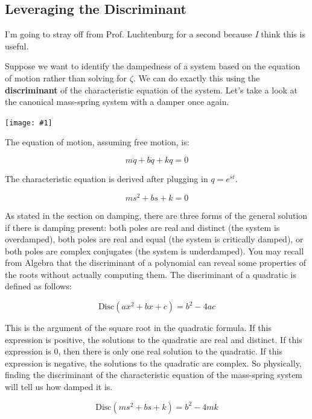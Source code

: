 \documentclass{report}
\newcommand{\bicture}[1]{
\begin{center}
    {\texttt{[image: \#1]}}
\end{center}}
\begin{document}
\begin{onehalfspacing}
\begin{flushleft}
\section{Leveraging the Discriminant}

I'm going to stray off from Prof. Luchtenburg for a second because \textit{I} think this is useful.

\medskip

Suppose we want to identify the dampedness of a system based on the equation of motion rather than solving for \(\zeta\). We can do exactly this using the \textbf{discriminant} of the characteristic equation of the system. Let's take a look at the canonical mass-spring system with a damper once again.

\bicture{2_unf}

The equation of motion, assuming free motion, is:

\vspace{-0.1in}
\[m\ddot{q} + b \dot{q} + k q = 0\]

The characteristic equation is derived after plugging in \(q = e^{st}\).

\vspace{-0.1in}
\[ms^2 + bs + k = 0\]

As stated in the section on damping, there are three forms of the general solution if there is damping present: both poles are real and distinct (the system is overdamped), both poles are real and equal (the system is critically damped), or both poles are complex conjugates (the system is underdamped). You may recall from Algebra that the discriminant of a polynomial can reveal some properties of the roots without actually computing them. The discriminant of a quadratic is defined as follows:

\vspace{-0.1in}
\[\text{Disc}(ax^2 + bx + c) = b^2-4ac\]

This is the argument of the square root in the quadratic formula. If this expression is positive, the solutions to the quadratic are real and distinct. If this expression is 0, then there is only one real solution to the quadratic. If this expression is negative, the solutions to the quadratic are complex. So physically, finding the discriminant of the characteristic equation of the mass-spring system will tell us how damped it is.

\vspace{-0.1in}
\[\text{Disc}(ms^2 + bs + k) = b^2-4mk\]

\vspace{-0.35in}


\end{flushleft}
\end{onehalfspacing}
\end{document}
